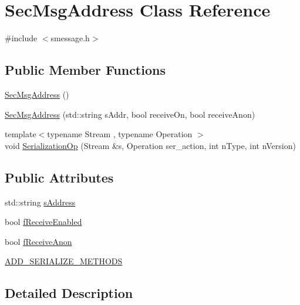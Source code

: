 \hypertarget{class_sec_msg_address}{}\section{Sec\+Msg\+Address Class Reference}
\label{class_sec_msg_address}


{\ttfamily \#include $<$smessage.\+h$>$}

\subsection*{Public Member Functions}
\begin{DoxyCompactItemize}
\item 
\hyperlink{class_sec_msg_address_af9bf7b0336ac539a99ab5f2a61e88f60}{Sec\+Msg\+Address} ()
\item 
\hyperlink{class_sec_msg_address_a8b4fbe93dcaf5bbcee30cb6f480227d0}{Sec\+Msg\+Address} (std\+::string s\+Addr, bool receive\+On, bool receive\+Anon)
\item 
{\footnotesize template$<$typename Stream , typename Operation $>$ }\\void \hyperlink{class_sec_msg_address_a6bdc333f6fa806bd842233b50a314329}{Serialization\+Op} (Stream \&s, Operation ser\+\_\+action, int n\+Type, int n\+Version)
\end{DoxyCompactItemize}
\subsection*{Public Attributes}
\begin{DoxyCompactItemize}
\item 
std\+::string \hyperlink{class_sec_msg_address_a75c5e24741cf29ee640244e0bf6d8ec4}{s\+Address}
\item 
bool \hyperlink{class_sec_msg_address_a7413861d7bc9036c5f832528ec7fa3ff}{f\+Receive\+Enabled}
\item 
bool \hyperlink{class_sec_msg_address_a6d8d71d0d6eec6643ad5bd12e411d3d4}{f\+Receive\+Anon}
\item 
\hyperlink{class_sec_msg_address_a1b2009d0b40c315053c4ed9625580155}{A\+D\+D\+\_\+\+S\+E\+R\+I\+A\+L\+I\+Z\+E\+\_\+\+M\+E\+T\+H\+O\+D\+S}
\end{DoxyCompactItemize}


\subsection{Detailed Description}


